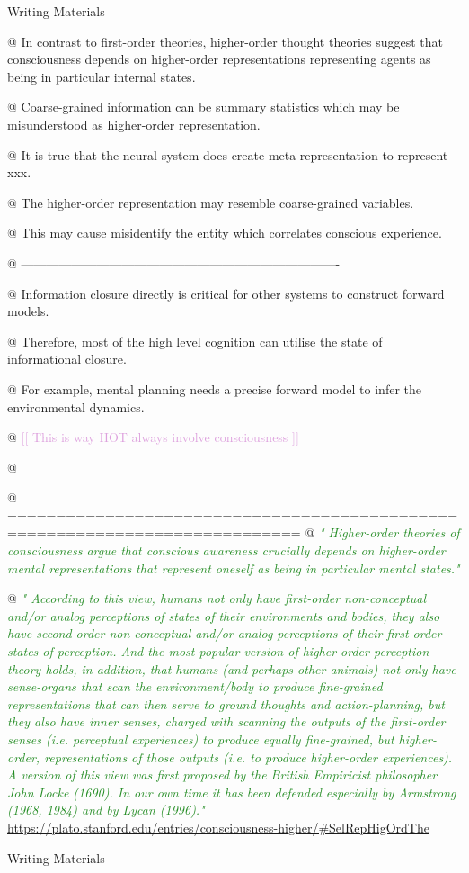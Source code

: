 \documentclass[utf8]{article}
\newenvironment{WritingMaterials} %
    	{
            \begin{tcolorbox}[enhanced,
                title=-,
                size=small,
                colbacktitle=Aquamarine,
                drop fuzzy shadow,
                fontupper=\small,
                boxrule=0.4pt,
                colback=Aquamarine!10!white,
                sharp corners]
                Writing Materials
            \end{tcolorbox}
            \begin{easylist}[itemize]
    	}
    	{
            \end{easylist}  
            \begin{tcolorbox}[enhanced,
                halign=flush right,
                halign title=right,
                size=small,
                colbacktitle=Aquamarine,
                drop fuzzy shadow,
                fontupper=\small,
                boxrule=0.4pt,
                colback=Aquamarine,
                colupper=White,
                sharp corners]
                Writing Materials -
            \end{tcolorbox}        
    	}
\newcommand{\rewrite}[1]{\textcolor{ForestGreen}{\textit{"#1"}}\newline}
\newcommand{\needref}[1]{%
			\ifthenelse{\equal{#1}{}}{%
				\todo[color=White, linecolor=Orange, bordercolor=Orange]{\textcolor{Orange}{Ref}}}{%
				\todo[color=White, linecolor=Orange, bordercolor=Orange]{\textcolor{Orange}{Ref: #1}}%
			}%
		}
\newcommand{\idea}[2][Plum]{\noindent
				\textcolor{#1}{[[ #2 ]]}}
\begin{document}
			\begin{WritingMaterials}
		    @ In contrast to first-order theories, higher-order thought theories suggest that consciousness depends on higher-order representations representing agents as being in particular internal states.
		    
		    @ Coarse-grained information can be summary statistics which may be misunderstood as higher-order representation.
		    
		    @ It is true that the neural system does create  meta-representation to represent xxx.\needref{Maybe come studies about confidence represenatation}
		    
		    @ The higher-order representation may resemble coarse-grained variables.
		    
		    @ This may cause misidentify the entity which correlates conscious experience.  
		    
		    
		    
		    @ ----------------------------------------------------------------------------
		    
			@ Information closure directly is critical for other systems to construct forward models.

			@ Therefore, most of the high level cognition can utilise the state of informational closure.

			@ For example, mental planning needs a precise forward model to infer the environmental dynamics.

			@ \idea{This is way HOT always involve consciousness }

			@ \cite{rosenthal2005consciousness}


            @ ============================================================================
			@ \rewrite{
				Higher-order theories of consciousness argue that conscious awareness crucially depends on higher-order mental representations that represent oneself as being in particular mental states.} \cite{lau2011empirical}


			@ \rewrite{
				According to this view, humans not only have first-order non-conceptual and/or analog perceptions of states of their environments and bodies, they also have second-order non-conceptual and/or analog perceptions of their first-order states of perception. And the most popular version of higher-order perception theory holds, in addition, that humans (and perhaps other animals) not only have sense-organs that scan the environment/body to produce fine-grained representations that can then serve to ground thoughts and action-planning, but they also have inner senses, charged with scanning the outputs of the first-order senses (i.e. perceptual experiences) to produce equally fine-grained, but higher-order, representations of those outputs (i.e. to produce higher-order experiences). A version of this view was first proposed by the British Empiricist philosopher John Locke (1690). In our own time it has been defended especially by Armstrong (1968, 1984) and by Lycan (1996).} \url{https://plato.stanford.edu/entries/consciousness-higher/#SelRepHigOrdThe}


\end{WritingMaterials}
\end{document}
